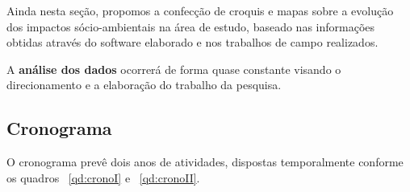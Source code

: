 Ainda nesta seção, propomos a confecção de croquis e mapas sobre a evolução dos impactos sócio-ambientais na área de estudo, baseado nas informações obtidas através do software elaborado e nos trabalhos de campo realizados.

A \textbf{análise dos dados} ocorrerá de forma quase constante visando o direcionamento e a elaboração do trabalho da pesquisa. 

\subsection{Cronograma}

O cronograma prevê dois anos de atividades, dispostas temporalmente conforme os quadros ~\ref{qd:cronoI} e ~\ref{qd:cronoII}.



